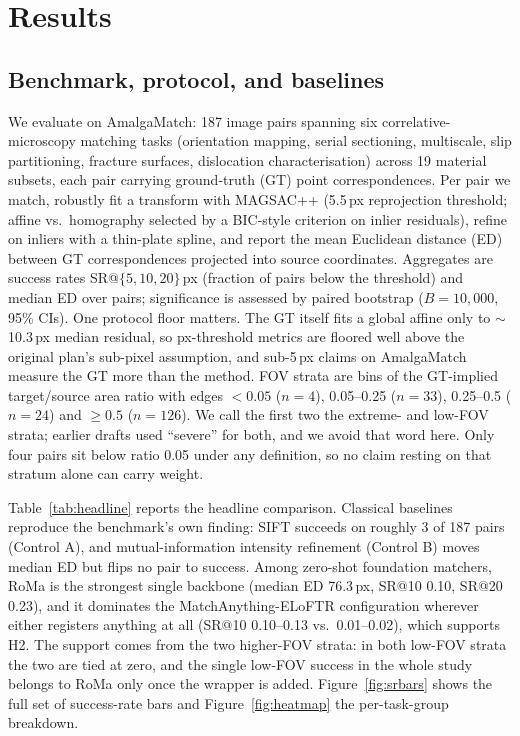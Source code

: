 \documentclass[fleqn,10pt]{wlscirep}
\begin{document}
\section*{Results}

\subsection*{Benchmark, protocol, and baselines}

We evaluate on AmalgaMatch\cite{durmaz2026amalgamatch}: 187 image pairs spanning six correlative-microscopy matching tasks (orientation mapping, serial sectioning, multiscale, slip partitioning, fracture surfaces, dislocation characterisation) across 19 material subsets, each pair carrying ground-truth (GT) point correspondences. Per pair we match, robustly fit a transform with MAGSAC++\cite{barath2020magsac} (5.5\,px reprojection threshold; affine vs.\ homography selected by a BIC-style criterion on inlier residuals), refine on inliers with a thin-plate spline\cite{bookstein1989tps}, and report the mean Euclidean distance (ED) between GT correspondences projected into source coordinates. Aggregates are success rates SR@$\{5,10,20\}$\,px (fraction of pairs below the threshold) and median ED over pairs; significance is assessed by paired bootstrap ($B=10{,}000$, 95\% CIs). One protocol floor matters. The GT itself fits a global affine only to $\sim$10.3\,px median residual, so px-threshold metrics are floored well above the original plan's sub-pixel assumption, and sub-5\,px claims on AmalgaMatch measure the GT more than the method. FOV strata are bins of the GT-implied target/source area ratio with edges $<0.05$ ($n=4$), 0.05--0.25 ($n=33$), 0.25--0.5 ($n=24$) and $\ge0.5$ ($n=126$). We call the first two the extreme- and low-FOV strata; earlier drafts used ``severe'' for both, and we avoid that word here. Only four pairs sit below ratio 0.05 under any definition, so no claim resting on that stratum alone can carry weight.

Table~\ref{tab:headline} reports the headline comparison. Classical baselines reproduce the benchmark's own finding: SIFT\cite{lowe2004sift} succeeds on roughly 3 of 187 pairs (Control A), and mutual-information intensity refinement\cite{maes1997mutualinfo} (Control B) moves median ED but flips no pair to success. Among zero-shot foundation matchers, RoMa is the strongest single backbone (median ED 76.3\,px, SR@10 0.10, SR@20 0.23), and it dominates the MatchAnything-ELoFTR configuration wherever either registers anything at all (SR@10 0.10--0.13 vs.\ 0.01--0.02), which supports H2. The support comes from the two higher-FOV strata: in both low-FOV strata the two are tied at zero, and the single low-FOV success in the whole study belongs to RoMa only once the wrapper is added. Figure~\ref{fig:srbars} shows the full set of success-rate bars and Figure~\ref{fig:heatmap} the per-task-group breakdown.
\end{document}
